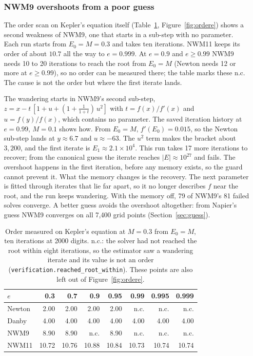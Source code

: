 \documentclass[sigconf,nonacm]{acmart}
\begin{document}
\subsubsection{NWM9 overshoots from a poor guess}
\label{sec:orderdrop}

The order scan on Kepler's equation itself (Table~\ref{tab:ordere},
Figure~\ref{fig:ordere}) shows a second weakness of NWM9, one that starts
in a sub-step with no parameter. Each run starts from $E_0 = M = 0.3$ and takes ten
iterations. NWM11 keeps its order of about $10.7$ all the way to
$e = 0.999$. At $e = 0.9$ and $e \ge 0.99$ NWM9 needs 10 to 20
iterations to reach the root from $E_0 = M$ (Newton needs 12 or more at
$e \ge 0.99$), so no order can be measured there; the table marks these
n.c. The cause is not the order but where the first iterate lands.

The wandering starts in NWM9's second sub-step,
$z = x - t\,[1 + u + (1 + \frac{1}{1+t})\,u^2]$ with $t = f(x)/f'(x)$ and
$u = f(y)/f(x)$, which contains no parameter. The saved iteration history at $e = 0.99$, $M = 0.1$ shows how. From
$E_0 = M$, $f'(E_0) = 0.015$, so the Newton sub-step lands at
$y \approx 6.7$ and $u \approx -63$. The $u^2$ term makes the bracket about
$3{,}200$, and the first iterate is $E_1 \approx 2.1\times10^{4}$. This run takes 17 more iterations to
recover; from the canonical guess the iterate reaches $|E| \approx 10^{27}$ and fails. The
overshoot happens in the first iteration, before any memory exists, so the
guard cannot prevent it. What the memory changes is the recovery. The next
parameter is fitted through iterates that lie far apart, so it no longer
describes $f$ near the root, and the run keeps wandering. With the memory
off, 79 of NWM9's 81 failed solves converge. A better guess avoids the overshoot
altogether: from Napier's guess NWM9 converges on all 7{,}400 grid points
(Section~\ref{sec:guess}).

\begin{table}[h]
\centering\footnotesize
\setlength{\tabcolsep}{3.2pt}
\caption{Order measured on Kepler's equation at $M = 0.3$ from $E_0 = M$,
ten iterations at 2000 digits. n.c.: the solver had not reached the root
within eight iterations, so the estimator saw a wandering iterate and its
value is not an order (\texttt{verification.reached\_root\_within}). These
points are also left out of Figure~\ref{fig:ordere}.}
\label{tab:ordere}
\begin{tabular}{@{}lrrrrrrr@{}}
\toprule
$e$ & 0.3 & 0.7 & 0.9 & 0.95 & 0.99 & 0.995 & 0.999 \\
\midrule
Newton & 2.00 & 2.00 & 2.00 & 2.00 & n.c. & n.c. & n.c. \\
Danby  & 4.00 & 4.00 & 4.00 & 4.00 & 4.00 & 4.00 & 4.00 \\
NWM9   & 8.90 & 8.90 & n.c. & 8.90 & n.c. & n.c. & n.c. \\
NWM11  & 10.72 & 10.76 & 10.88 & 10.84 & 10.73 & 10.74 & 10.74 \\
\bottomrule
\end{tabular}
\end{table}
\end{document}
